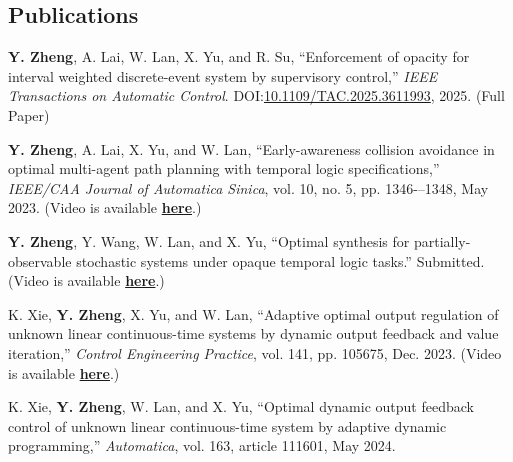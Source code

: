 \documentclass[11pt]{article}
\newcommand\doilink[1]{\href{http://dx.doi.org/#1}{#1}}
\newcommand\doi[1]{DOI:\doilink{#1}}
\begin{document}
\subsection*{Publications}
\begin{bibenum}[itemsep=5pt, label=\textbf{[\arabic*] }]



    \item \textbf{Y. Zheng}, A. Lai, W. Lan, X. Yu, and R. Su,
    ``Enforcement of opacity for interval weighted discrete-event system by supervisory control,'' 
    \emph{IEEE Transactions on Automatic Control}.
    \doi{10.1109/TAC.2025.3611993}, 2025. (Full Paper)

    \item \textbf{Y. Zheng}, A. Lai, X. Yu, and W. Lan, 
    ``Early-awareness collision avoidance in optimal multi-agent path planning with temporal logic specifications,''
    \emph{IEEE/CAA Journal of Automatica Sinica}, vol. 10, no. 5, pp. 1346-–1348, May 2023.
    (Video is available \href{https://www.youtube.com/playlist?list=PLWlDMqOM9D2QprwUcfTXYbPa6IsiOVBEZ}{\textbf{here}}.)

    \item \textbf{Y. Zheng}, Y. Wang, W. Lan, and X. Yu,
    ``Optimal synthesis for partially-observable stochastic systems under opaque temporal logic tasks.'' 
    Submitted.
    (Video is available \href{https://www.youtube.com/playlist?list=PLWlDMqOM9D2Q1lAKcFA_GbEFAeicVcVh2}{\textbf{here}}.)

    \item K. Xie, \textbf{Y. Zheng}, X. Yu, and W. Lan, 
    ``Adaptive optimal output regulation of unknown linear continuous-time systems by dynamic output feedback and value iteration,''
    \emph{Control Engineering Practice}, vol. 141, pp. 105675, Dec. 2023.
    (Video is available \href{https://github.com/trigger1996/Unknown_System_Regulation_ADP}{\textbf{here}}.)

    \item K. Xie, \textbf{Y. Zheng}, W. Lan, and X. Yu, 
    ``Optimal dynamic output feedback control of unknown linear continuous-time system by adaptive dynamic programming,''
    \emph{Automatica}, vol. 163, article 111601, May 2024.


\end{bibenum}
\end{document}

